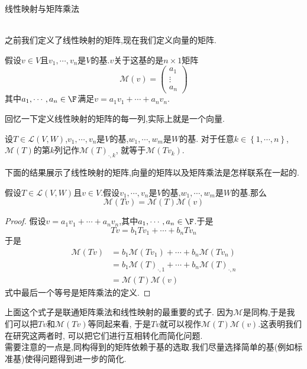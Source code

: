 \documentclass{ctexart}
\begin{document}
\pagestyle{empty}
\begin{center}\large 线性映射与矩阵乘法\end{center}
\\
之前我们定义了线性映射的矩阵,现在我们定义向量的矩阵.
\begin{definition}[1.1 定义:向量的矩阵]
    假设$v\in V$且$v_1,\cdots,v_n$是$V$的基.$v$关于这基的是$n\times 1$矩阵
    $$\mathcal{M}(v)=\begin{pmatrix}
        a_1\\\vdots\\a_n
    \end{pmatrix}$$
    其中$a_1,\cdots,a_n\in\F$满足$v=a_1v_1+\cdots+a_nv_n$.
\end{definition}\noindent
回忆一下定义线性映射的矩阵的每一列,实际上就是一个向量.
\begin{formal}[1.2 矩阵的列是映成空间的向量]
    设$T\in\mathcal{L}(V,W)$,$v_1,\cdots,v_n$是$V$的基,$w_1,\cdots,w_m$是$W$的基.
    对于任意$k\in\left\{1,\cdots,n\right\}$,$\mathcal{M}(T)$的第$k$列记作$\mathcal{M}(T)_{\cdot,k}$,
    就等于$\mathcal{M}(Tv_k)$.
\end{formal}\noindent
下面的结果展示了线性映射的矩阵,向量的矩阵以及矩阵乘法是怎样联系在一起的.
\begin{formal}[1.3 线性映射可以视作矩阵乘法]
    假设$T\in\mathcal{L}(V,W)$且$v\in V$.假设$v_1,\cdots,v_n$是$V$的基,$w_1,\cdots,w_m$是$W$的基.那么
    $$\mathcal{M}(Tv)=\mathcal{M}(T)\mathcal{M}(v)$$
\end{formal}
\begin{proof}
    假设$v=a_1v_1+\cdots+a_nv_n$,其中$a_1,\cdots,a_n\in\F$.于是
    $$Tv=b_1Tv_1+\cdots+b_nTv_n$$
    于是
    $$\begin{aligned}
        \mathcal{M}(Tv)
        &= b_1\mathcal{M}(Tv_1)+\cdots+b_n\mathcal{M}(Tv_n) \\
        &= b_1\mathcal{M}(T)_{\cdot,1}+\cdots+b_n\mathcal{M}(T)_{\cdot,n} \\
        &= \mathcal{M}(T)\mathcal{M}(v)
    \end{aligned}$$
    式中最后一个等号是矩阵乘法的定义.
\end{proof}\noindent
上面这个式子是联通矩阵乘法和线性映射的最重要的式子.
因为$\mathcal{M}$是同构,于是我们可以把$Tv$和$\mathcal{M}(Tv)$等同起来看,
于是$Tv$就可以视作$\mathcal{M}(T)\mathcal{M}(v)$.这表明我们在研究这两者时,
可以把它们进行互相转化而简化问题.\\
需要注意的一点是,同构得到的矩阵依赖于基的选取.我们尽量选择简单的基(例如标准基)使得问题得到进一步的简化.\\
\end{document}
